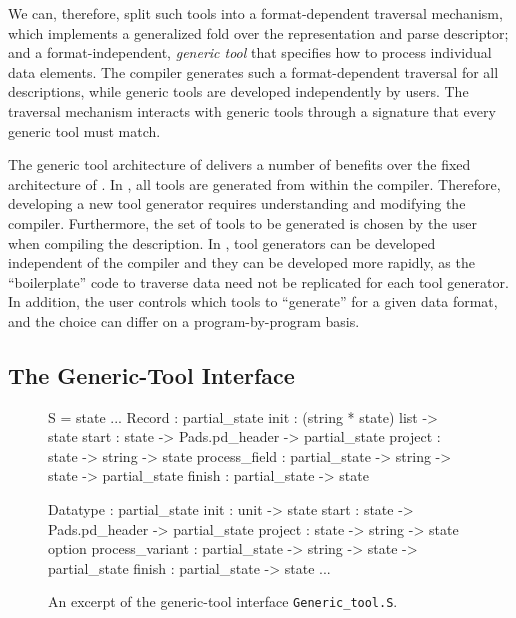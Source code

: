We can, therefore, split such tools into a format-dependent traversal
mechanism, which implements a generalized fold over the representation
and parse descriptor; and a format-independent, \emph{generic tool}
that specifies how to process individual data elements. The \padsml{}
compiler generates such a format-dependent traversal for all
descriptions, while generic tools are developed independently by
users. The traversal mechanism interacts with generic tools through a
signature that every generic tool must match.

The generic tool architecture of \padsml{} delivers a number of
benefits over the fixed architecture of \padsc{}. In \padsc{}, all
tools are generated from within the compiler. Therefore, developing a
new tool generator requires understanding and modifying the compiler.
Furthermore, the set of tools to be generated is chosen by the user
when compiling the description.  In \padsml{}, tool generators can be
developed independent of the compiler and they can be developed more
rapidly, as the ``boilerplate'' code to traverse data need not be
replicated for each tool generator. In addition, the user controls
which tools to ``generate'' for a given data format, and the choice
can differ on a program-by-program basis.

\subsection{The Generic-Tool Interface}
\label{sec:gentool-interface}

\begin{figure}
\begin{code}\scriptsize
{}  S = 
   state
  ...
   Record : 
     partial_state
      init          : (string * state) list -> state
      start         : state -> Pads.pd_header 
                         -> partial_state
      project       : state -> string -> state
      process_field : partial_state -> string
                         -> state -> partial_state
      finish        : partial_state -> state

   Datatype : 
     partial_state
      init            : unit -> state
      start           : state -> Pads.pd_header 
                           -> partial_state
      project         : state -> string -> state option
      process_variant : partial_state -> string 
                           -> state -> partial_state
      finish          : partial_state -> state
   ...
\end{code}
\caption{An excerpt of the generic-tool interface \texttt{Generic\_tool.S}.}
\label{fig:gentool-interface}
\end{figure}

